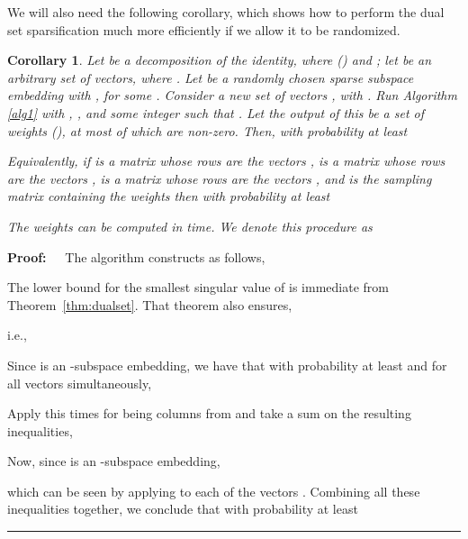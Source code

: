 \documentclass[11pt]{article}
\newcommand{\FNormS}[1]{\mbox{}\|#1\|_\mathrm{F}^2}
\newcommand{\TNormS}[1]{\mbox{}\|#1\|_2^2}
\newtheorem{corollary}[theorem]{Corollary}
\newenvironment{proof}{\begin{trivlist} \item {\bf Proof:~~}}
  {\qed\end{trivlist}}
\newcommand{\trace}{\text{\rm Tr}}
\newcommand{\mat}[1]{{\ensuremath{\bm{\mathrm{#1}}}}}
\def\ve{{\mathbf v}}
\def\matA{\mat{A}}
\def\matS{\mat{S}}
\def\matV{\mat{V}}
\def\matW{\mat{W}}
\def\math#1{}
\def\frac#1#2{{#1\over #2}}
\def\eqan#1{}
\def\qed{\hfill\rule{2mm}{2mm}}
\def\cl#1{{\cal #1}}
\def\a{{\mathbf a}}
\begin{document}
We will also need the following corollary, which shows how to perform the dual set sparsification much more
efficiently if we allow it to be randomized. 

\begin{corollary}\label{lem:dualnnz}
Let \math{\cl V=\{\ve_1,\ldots,\ve_n\}} be a decomposition of the identity, where \math{\ve_i\in \mathbb{R}^{k}} () and
; let \math{\cl A=\{\a_1,\ldots,\a_n\}} be an arbitrary set
of vectors, where \math{\a_i\in\mathbb{R}^{\ell}}. Let  be a randomly chosen
sparse subspace embedding with , for some . 
Consider a new set of vectors  \math{\cl B = \{\matW\a_1,\ldots, \matW\a_n\}},
with \math{\matW\a_i \in \mathbb{R}^{\xi}}. Run Algorithm \ref{alg1} with \math{\cl V=\{\ve_1,\ldots,\ve_n\}},
\math{\cl B = \{\matW\a_1,\ldots, \matW\a_n\}}, and some integer \math{r} such that \math{k < r \le n}. Let the output
of this be a set of weights \math{s_i\ge 0} (), at most \math{r} of which are non-zero. 
Then, with probability at least 
\eqan{
\lambda_{k}\left(\sum_{i=1}^ns_i \ve_i \ve_i^T\right)
&\ge&
\left(1 - \sqrt{\frac{k}{r}}\right)^2,
\qquad\\
\trace\left(\sum_{i=1}^n s_i \a_i \a_i^T\right)
&\le&
\frac{1 + \varepsilon }{1 - \varepsilon} \cdot
\trace\left(\sum_{i=1}^n \a_i \a_i^T\right) \\
&=&
\frac{1 + \varepsilon }{1 - \varepsilon} \cdot
\sum_{i=1}^n \TNormS{\a_i}.
}
Equivalently,
if  is a matrix whose rows are the vectors ,
 is a matrix whose rows are the vectors ,
 is a matrix whose rows are the vectors ,
and
 is the sampling matrix containing 
the weights  then with probability at least 
\eqan{
\sigma_{k}\left( \matV^T \matS\right)
\ge
1 - \sqrt{{k}/{r}},
\qquad
\FNormS{\matA^T\matS}
\le
\frac{1 + \varepsilon }{1 - \varepsilon} \cdot
\FNormS{\matA}.
}
The weights  can be computed in  time. We denote this procedure as

\end{corollary}
\begin{proof}
The algorithm constructs  as follows,

The lower bound for the smallest singular value of  is immediate from Theorem~\ref{thm:dualset}. That theorem also ensures,
 
i.e.,

Since  is an -subspace embedding, we have that with probability at least  
and for all vectors  simultaneously,

Apply this  times for  being columns from  
and take a sum on the resulting inequalities,

Now, since  is an -subspace embedding, 

which can be seen by applying  to each of the vectors . 
Combining all these inequalities together, we conclude that with probability at least 

\end{proof}
\end{document}
